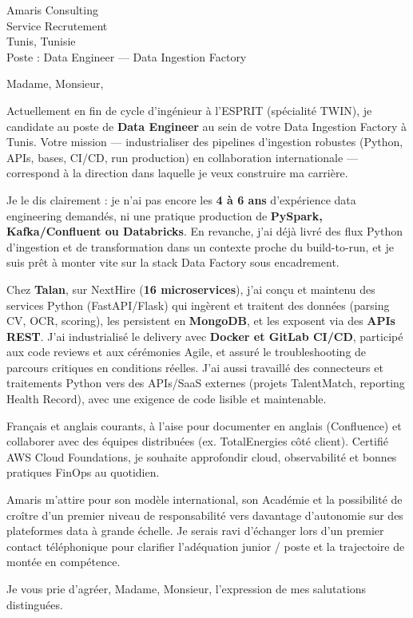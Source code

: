 \documentclass[11pt,a4paper]{letter}
\date{\today}
\begin{document}
\begin{letter}{%
  Amaris Consulting\\
  Service Recrutement\\
  Tunis, Tunisie\\
  Poste : Data Engineer — Data Ingestion Factory%
}

\opening{Madame, Monsieur,}

Actuellement en fin de cycle d'ingénieur à l'ESPRIT (spécialité TWIN), je candidate au poste de \textbf{Data Engineer} au sein de votre Data Ingestion Factory à Tunis. Votre mission — industrialiser des pipelines d'ingestion robustes (Python, APIs, bases, CI/CD, run production) en collaboration internationale — correspond à la direction dans laquelle je veux construire ma carrière.

Je le dis clairement : je n'ai pas encore les \textbf{4 à 6 ans} d'expérience data engineering demandés, ni une pratique production de \textbf{PySpark, Kafka/Confluent ou Databricks}. En revanche, j'ai déjà livré des flux Python d'ingestion et de transformation dans un contexte proche du build-to-run, et je suis prêt à monter vite sur la stack Data Factory sous encadrement.

Chez \textbf{Talan}, sur NextHire (\textbf{16 microservices}), j'ai conçu et maintenu des services Python (FastAPI/Flask) qui ingèrent et traitent des données (parsing CV, OCR, scoring), les persistent en \textbf{MongoDB}, et les exposent via des \textbf{APIs REST}. J'ai industrialisé le delivery avec \textbf{Docker et GitLab CI/CD}, participé aux code reviews et aux cérémonies Agile, et assuré le troubleshooting de parcours critiques en conditions réelles. J'ai aussi travaillé des connecteurs et traitements Python vers des APIs/SaaS externes (projets TalentMatch, reporting Health Record), avec une exigence de code lisible et maintenable.

Français et anglais courants, à l'aise pour documenter en anglais (Confluence) et collaborer avec des équipes distribuées (ex. TotalEnergies côté client). Certifié AWS Cloud Foundations, je souhaite approfondir cloud, observabilité et bonnes pratiques FinOps au quotidien.

Amaris m'attire pour son modèle international, son Académie et la possibilité de croître d'un premier niveau de responsabilité vers davantage d'autonomie sur des plateformes data à grande échelle. Je serais ravi d'échanger lors d'un premier contact téléphonique pour clarifier l'adéquation junior / poste et la trajectoire de montée en compétence.

\closing{Je vous prie d'agréer, Madame, Monsieur, l'expression de mes salutations distinguées.}

\end{letter}
\end{document}
